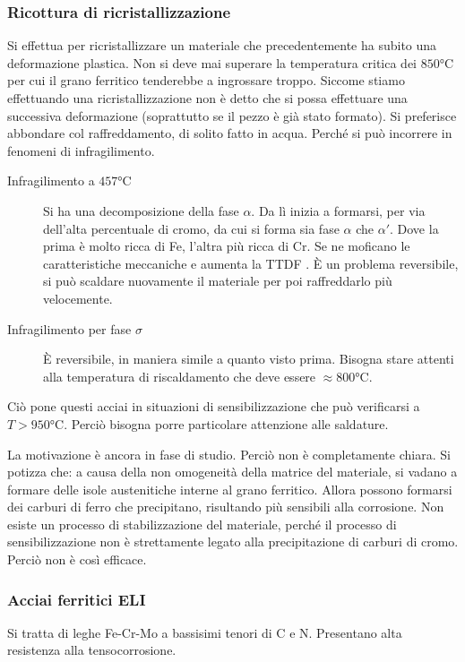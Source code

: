 \subsubsection{Ricottura di ricristallizzazione}
Si effettua per ricristallizzare un materiale che precedentemente ha subito 
una deformazione plastica.
Non si deve mai superare la temperatura critica dei $850\unit{\celsius}$ per 
cui il grano ferritico tenderebbe a ingrossare troppo.
Siccome stiamo effettuando una ricristallizzazione non è detto che si possa 
effettuare una successiva deformazione (soprattutto se il pezzo è già 
stato formato).
Si preferisce abbondare col raffreddamento, di solito fatto in acqua.
Perché si può incorrere in fenomeni di infragilimento.
\begin{description}
\item[Infragilimento a $457\unit{\celsius}$] Si ha una decomposizione della 
fase $\alpha$. Da lì inizia a formarsi, per via dell'alta percentuale di 
cromo, da cui si forma sia fase $\alpha$ che $\alpha'$.
Dove la prima è molto ricca di Fe, l'altra più ricca di Cr.
Se ne moficano le caratteristiche meccaniche e aumenta la TTDF%
.
È un problema reversibile, si può scaldare nuovamente il materiale per 
poi raffreddarlo più velocemente.
\item[Infragilimento per fase $\sigma$] È reversibile, in maniera simile 
a quanto visto prima. Bisogna stare attenti alla temperatura di 
riscaldamento che deve essere $\approx 800\unit{\celsius}$. 
\end{description}

Ciò pone questi acciai in situazioni di sensibilizzazione
che può verificarsi a $T > 950\unit{\celsius}$. Perciò bisogna porre 
particolare attenzione alle saldature.

La motivazione è ancora in fase di studio. Perciò non è completamente chiara.
Si potizza che: a causa della non omogeneità della matrice del materiale, si 
vadano a formare delle isole austenitiche interne al grano ferritico.
Allora possono formarsi dei carburi di ferro che precipitano, risultando più 
sensibili alla corrosione.
Non esiste un processo di stabilizzazione del materiale, perché il processo
di sensibilizzazione non è strettamente legato alla precipitazione di 
carburi di cromo. Perciò non è così efficace.

\subsubsection{Acciai ferritici ELI}
Si tratta di leghe Fe-Cr-Mo a bassisimi tenori di C e N.
Presentano alta resistenza alla tensocorrosione.

